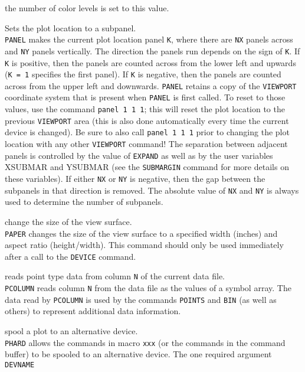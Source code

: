 	the number of color levels is set to this value.
\item [{\tt PANEL nx ny k } --] Sets the plot location to a subpanel.\\
	{\tt PANEL} makes the current plot location panel
	{\tt K}, where there are {\tt NX} panels across
	and {\tt NY} panels vertically.  The direction the panels
	run depends on the sign of {\tt K}.  If {\tt K} is
	positive, then the panels are counted across from the lower left
	and upwards ({\tt K = 1} specifies the first panel).  If
	{\tt K} is negative, then the panels are counted across
	from the upper left and downwards.  {\tt PANEL} retains a
	copy of the {\tt VIEWPORT} coordinate
	system that is present when {\tt PANEL} is first called.
	To reset to those values, use the command {\tt panel 1 1 1};
	this will reset the plot location to the previous
	{\tt VIEWPORT} area (this is also
	done automatically every time the current device is changed).
	Be sure to also call {\tt panel 1 1 1} prior to changing
	the plot location with any other
	{\tt VIEWPORT} command!  The
	separation between adjacent panels is controlled by the value of
	{\tt EXPAND} as well as by the user
	variables XSUBMAR and YSUBMAR (see the
	{\tt SUBMARGIN} command for more
	details on these variables).  If either {\tt NX} or
	{\tt NY} is negative, then the gap between the subpanels in
	that direction is removed.  The absolute value of {\tt NX}
	and {\tt NY} is always used to determine the number of subpanels.
\item [{\tt PAPER width aspect } --] change the size of the view surface.\\
	{\tt PAPER} changes the size of the view surface to a
	specified width (inches) and aspect ratio (height/width).  This
	command should only be used immediately after a call to the
	{\tt DEVICE} command.
\item [{\tt PCOLUMN n } --] reads point type data from column {\tt N} of the current data file.\\
	{\tt PCOLUMN} reads column {\tt N} from the data
	file as the values of a symbol array.  The data read by
	{\tt PCOLUMN} is used by the commands
	{\tt POINTS} and
	{\tt BIN} (as well as others) to
	represent additional data information.
\item [{\tt PHARD devname [xxx args] } --] spool a plot to an alternative device.\\
	{\tt PHARD} allows the commands in macro {\tt xxx}
	(or the commands in the command buffer) to be spooled to an
	alternative device.  The one required argument {\tt DEVNAME}
